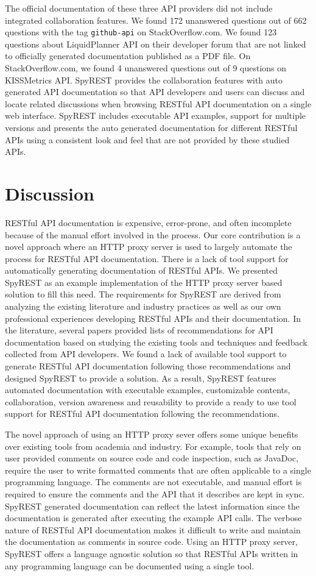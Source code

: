 The official documentation of these three API providers did not include integrated collaboration features. We found 172 unanswered questions out of 662 questions with the tag \texttt{github-api} on StackOverflow.com. We found 123 questions about LiquidPlanner API on their developer forum that are not linked to officially generated documentation published as a PDF file. On StackOverflow.com, we found 4 unanswered questions out of 9 questions on KISSMetrics API. SpyREST provides the collaboration features with auto generated API documentation so that API developers and users can discuss and locate related discussions when browsing RESTful API documentation on a single web interface. SpyREST includes executable API examples, support for multiple versions and presents the auto generated documentation for different RESTful APIs using a consistent look and feel that are not provided by these studied APIs.

\section{Discussion}
RESTful API documentation is expensive, error-prone, and often incomplete because of the manual effort involved in the process. Our core contribution is a novel approach where an HTTP proxy server is used to largely automate the process for RESTful API documentation. There is a lack of tool support for automatically generating documentation of RESTful APIs. We presented SpyREST as an example implementation of the HTTP proxy server based solution to fill this need. The requirements for SpyREST are derived from analyzing the existing literature and industry practices as well as our own professional experiences developing RESTful APIs and their documentation. In the literature, several papers provided lists of recommendations for API documentation based on studying the existing tools and techniques and feedback collected from API developers. We found a lack of available tool support to generate RESTful API documentation following those recommendations and designed SpyREST to provide a solution. As a result, SpyREST features automated documentation with executable examples, customizable contents, collaboration, version awareness and reusability to provide a ready to use tool support for RESTful API documentation following the recommendations.

The novel approach of using an HTTP proxy sever offers some unique benefits over existing tools from academia and industry. For example, tools that rely on user provided comments on source code and code inspection, such as JavaDoc, require the user to write formatted comments that are often applicable to a single programming language. The comments are not executable, and manual effort is required to ensure the comments and the API that it describes are kept in sync. SpyREST generated documentation can reflect the latest information since the documentation is generated after executing the example API calls. The verbose nature of RESTful API documentation makes it difficult to write and maintain the documentation as comments in source code. Using an HTTP proxy server, SpyREST offers a language agnostic solution so that RESTful APIs written in any programming language can be documented using a single tool.

